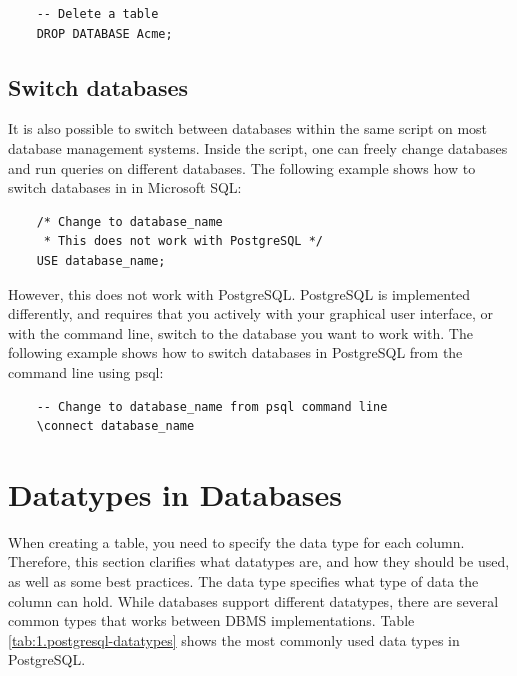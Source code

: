 \begin{verbatim}
    -- Delete a table
    DROP DATABASE Acme;
\end{verbatim}

\subsection{Switch databases}
It is also possible to switch between databases within the same script on most database management systems. Inside the script, one can freely change databases and run queries on different databases. The following example shows how to switch databases in in Microsoft SQL:

\begin{verbatim}
    /* Change to database_name
     * This does not work with PostgreSQL */
    USE database_name;
\end{verbatim}

However, this does not work with PostgreSQL. PostgreSQL is implemented differently, and requires that you actively with your graphical user interface, or with the command line, switch to the database you want to work with. The following example shows how to switch databases in PostgreSQL from the command line using psql:

\begin{verbatim}
    -- Change to database_name from psql command line
    \connect database_name
\end{verbatim}

\section{Datatypes in Databases}
When creating a table, you need to specify the data type for each column. Therefore, this section clarifies what datatypes are, and how they should be used, as well as some best practices. The data type specifies what type of data the column can hold. While databases support different datatypes, there are several common types that works between DBMS implementations. Table \ref{tab:1.postgresql-datatypes} shows the most commonly used data types in PostgreSQL.

